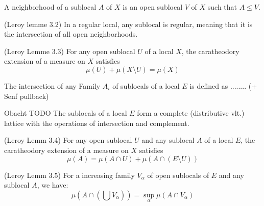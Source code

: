 \begin{definition}[Neighborhood]
    \label{def:neighborhood}
    A neighborhood of a sublocal $A$ of $X$ is an open sublocal $V$ of $X$ such that $A \le V$.
\end{definition}

\begin{lemma}
(Leroy lemme 3.2)
    \label{lem:regularity_of_sublocals}
    In a regular local, any sublocal is regular, meaning that it is the intersection of all open neighborhoods.
\end{lemma}


\begin{lemma}[Property 1]
(Leroy Lemme 3.3)
    \label{lem:property_1}
    For any open sublocal $U$ of a local $X$, the caratheodory extension of a measure on $X$ satisfies \[\mu(U) + \mu(X \setminus U) = \mu(X)\]
\end{lemma}

\begin{definition}[Intersection]
    \label{def:intersection}
    The intersection of any Family $A_i$ of sublocals of a local $E$ is defined as ........ (+ Senf pullback)
\end{definition}

\begin{proposition}
    Obacht TODO
    \label{prop:sublocals_structure}
    The sublocals of a local $E$ form a complete (distributive vlt.) lattice with the operations of intersection and complement.
\end{proposition}


\begin{lemma}[Property 2]
(Leroy Lemm 3.4)
    \label{lem:property_2}
    For any open sublocal $U$ and any sublocal $A$ of a local $E$, the caratheodory extension of a measure on $X$ satisfies \[\mu(A) = \mu(A \cap U) + \mu(A \cap(E\setminus U))\]
\end{lemma}

\begin{lemma}[Property 3]
(Leroy Lemm 3.5)
    \label{lem:property_3}
    For a increasing family $V_{\alpha}$ of open sublocals of $E$ and any sublocal $A$, we have:
    \[\mu(A \cap(\bigcup V_{\alpha})) = \sup_\alpha \mu(A\cap V_\alpha)\]
\end{lemma}


